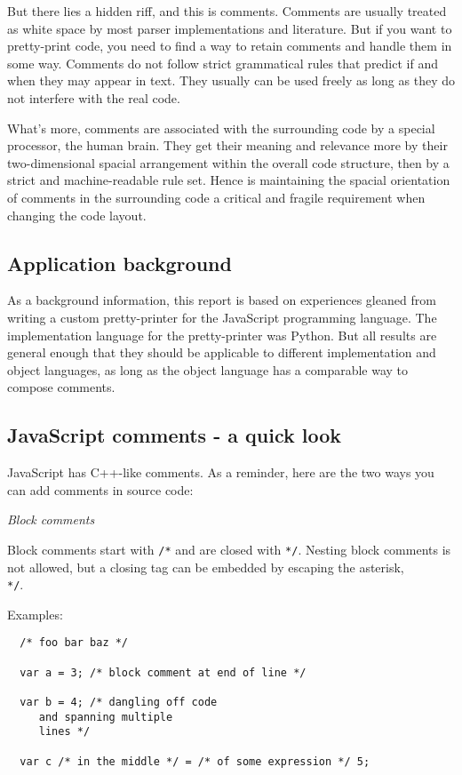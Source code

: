 \documentclass[11pt,a4paper]{article}
\begin{document}
But there lies a hidden riff, and this is comments.  Comments are usually
treated as white space by most parser implementations and literature. But if you
want to pretty-print code, you need to find a way to retain comments and handle
them in some way. Comments do not follow strict grammatical rules that predict
if and when they may appear in text. They usually can be used freely as long as
they do not interfere with the real code.

What's more, comments are associated with the surrounding code by a special
processor, the human brain. They get their meaning and relevance more by their
two-dimensional spacial arrangement within the overall code structure, then by
a strict and machine-readable rule set. Hence is maintaining the spacial
orientation of comments in the surrounding code a critical and fragile
requirement when changing the code layout.


\subsection{Application background}

As a background information, this report is based on experiences gleaned from
writing a custom pretty-printer for the JavaScript programming language. The
implementation language for the pretty-printer was Python. But all results are
general enough that they should be applicable to different implementation and
object languages, as long as the object language has a comparable way to compose
comments.

\subsection{JavaScript comments - a quick look}

JavaScript has C++-like comments. As a reminder, here are the two ways you
can add comments in source code:

\textit{Block comments}

Block comments start with \texttt{/*} and are closed with \texttt{*/}. Nesting
block comments is not allowed, but a closing tag can be embedded by escaping the
asterisk, \texttt{\\*/}.

Examples:

\begin{verbatim}
  /* foo bar baz */

  var a = 3; /* block comment at end of line */

  var b = 4; /* dangling off code
     and spanning multiple
     lines */

  var c /* in the middle */ = /* of some expression */ 5;

\end{verbatim}
\end{document}
